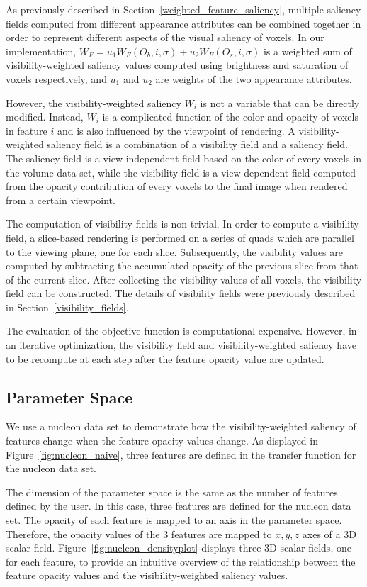 As previously described in Section~\ref{weighted_feature_saliency}, multiple saliency fields computed from different appearance attributes can be combined together in order to represent different aspects of the visual saliency of voxels.
In our implementation, $ W_{F}=u_{1}W_{F}(O_{b},i,\sigma)+u_{2}W_{F}(O_{s},i,\sigma) $ is a weighted sum of visibility-weighted saliency values computed using brightness and saturation of voxels respectively, and $ u_{1} $ and $ u_{2} $ are weights of the two appearance attributes.

However, the visibility-weighted saliency $ W_{i} $ is not a variable that can be directly modified. Instead, $ W_{i} $ is a complicated function of the color and opacity of voxels in feature $ i $ and is also influenced by the viewpoint of rendering. A visibility-weighted saliency field is a combination of a visibility field and a saliency field. The saliency field is a view-independent field based on the color of every voxels in the volume data set, while the visibility field is a view-dependent field computed from the opacity contribution of every voxels to the final image when rendered from a certain viewpoint.

The computation of visibility fields is non-trivial. In order to compute a visibility field, a slice-based rendering is performed on a series of quads which are parallel to the viewing plane, one for each slice.
Subsequently, the visibility values are computed by subtracting the accumulated opacity of the previous slice from that of the current slice. After collecting the visibility values of all voxels, the visibility field can be constructed. The details of visibility fields were previously described in Section~\ref{visibility_fields}.

The evaluation of the objective function is computational expensive. However, in an iterative optimization, the visibility field and visibility-weighted saliency have to be recompute at each step after the feature opacity value are updated.

\subsection{Parameter Space}
We use a nucleon data set to demonstrate how the visibility-weighted saliency of features change when the feature opacity values change. As displayed in Figure~\ref{fig:nucleon_naive}, three features are defined in the transfer function for the nucleon data set.

The dimension of the parameter space is the same as the number of features defined by the user. In this case, three features are defined for the nucleon data set. The opacity of each feature is mapped to an axis in the parameter space. Therefore, the opacity values of the 3 features are mapped to $ x, y, z $ axes of a 3D scalar field. Figure~\ref{fig:nucleon_densityplot} displays three 3D scalar fields, one for each feature, to provide an intuitive overview of the relationship between the feature opacity values and the visibility-weighted saliency values.

